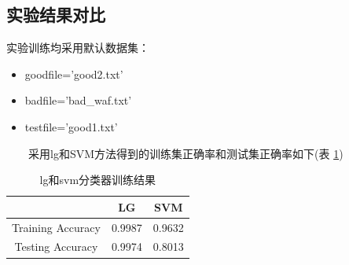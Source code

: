\subsection{实验结果对比}
实验训练均采用默认数据集：
\begin{itemize}
    \item goodfile='good2.txt'
    \item badfile='bad\_waf.txt'
    \item testfile='good1.txt'
\end{itemize}
\ \ \ \ 采用lg和SVM方法得到的训练集正确率和测试集正确率如下(表 \ref{table:no_keams})
\begin{table}[!ht]
    \setlength{\abovecaptionskip}{0.cm}
    \setlength{\belowcaptionskip}{-0.cm}
    \caption{lg和svm分类器训练结果}
    \centering
    \label{table:no_keams}    
    \begin{tabular}{|c|c|c|}
        \hline
        &LG&SVM\\
        \hline
        Training Accuracy&0.9987&0.9632\\
        \hline
        Testing Accuracy&0.9974&0.8013\\
        \hline
    \end{tabular}
\end{table}
